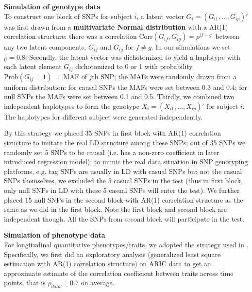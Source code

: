 \documentclass[12pt]{article}
\begin{document}
\textbf{Simulation of genotype data}\\
To construct one block of SNPs for subject $i$, a latent vector $G_i = (G_{i1}, \ldots, G_{ip})'$ was first drawn from a \textbf{multivariate Normal distribution} with a AR(1) correlation structure: there was a correlation $\textrm{Corr} (G_{if}, G_{ig}) = \rho ^ { |f - g| }$ between any two latent components, $G_{if}$ and $G_{ig}$ for $f \neq g$. In our simulations we set $\rho = 0.8$. Secondly, the latent vector was dichotomized to yield a haplotype with each latent element $G_{ij}$ dichotomized to 0 or 1 with probability $\textrm{Prob} (G_{ij} = 1) = $ MAF of $j$th SNP; the MAFs were randomly drawn from a uniform distribution: for causal SNPs the MAFs were set between 0.3 and 0.4; for null SNPs the MAFs were set between 0.1 and 0.5. Thirdly, we combined two independent haplotypes to form the genotype $X_i = (X_{i1}, \ldots, X_{ip})' $ for subject $i$. The haplotypes for different subject were generated independently.

By this strategy we placed 35 SNPs in first block with AR(1) correlation structure to imitate the real LD structure among these SNPs; out of 35 SNPs we randomly set 5 SNPs to be causal (i.e. has a non-zero coefficient in later introduced regression model); to mimic the real data situation in SNP genotyping platforms, e.g. tag SNPs are usually in LD with casual SNPs but not the casual SNPs themselves, we excluded the 5 casual SNPs in the test (thus in first block, only null SNPs in LD with these 5 casual SNPs will enter the test). We further placed 15 null SNPs in the second block with AR(1) correlation structure as the same as we did in the first block. Note the first block and second block are independent though. All the SNPs from second block will participate in the test.

\textbf{Simulation of phenotype data}\\
For longitudinal quantitative phenotypes/traits, we adopted the strategy used in \cite{Song2013}. Specifically, we first did an exploratory analysis (generalized least square estimation with AR(1) correlation structure) on ARIC data to get an approximate estimate of the correlation coefficient between traits across time points, that is $\rho_{data} = 0.7$ on average. 
\end{document}
